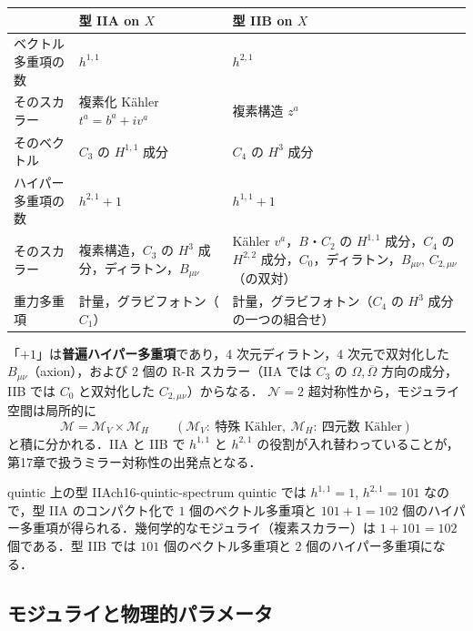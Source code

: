 \begin{center}
\small
\renewcommand{\arraystretch}{1.2}
\begin{tabular}{p{}p{}p{}}
\hline
 & 型 IIA on $X$ & 型 IIB on $X$\\
\hline
ベクトル多重項の数 & $h^{1,1}$ & $h^{2,1}$\\
\quad そのスカラー & 複素化 K\"ahler $t^a=b^a+iv^a$ & 複素構造 $z^a$\\
\quad そのベクトル & $C_3$ の $H^{1,1}$ 成分 & $C_4$ の $H^3$ 成分\\
ハイパー多重項の数 & $h^{2,1}+1$ & $h^{1,1}+1$\\
\quad そのスカラー & 複素構造，$C_3$ の $H^3$ 成分，ディラトン，$B_{\mu\nu}$ & K\"ahler $v^a$，$B$・$C_2$ の $H^{1,1}$ 成分，$C_4$ の $H^{2,2}$ 成分，$C_0$，ディラトン，$B_{\mu\nu}$, $C_{2,\mu\nu}$（の双対）\\
重力多重項 & 計量，グラビフォトン（$C_1$） & 計量，グラビフォトン（$C_4$ の $H^3$ 成分の一つの組合せ）\\
\hline
\end{tabular}
\end{center}

「$+1$」は\textbf{普遍ハイパー多重項}であり，4 次元ディラトン，4 次元で双対化した $B_{\mu\nu}$（axion），および 2 個の R-R スカラー（IIA では $C_3$ の $\Omega,\overline\Omega$ 方向の成分，IIB では $C_0$ と双対化した $C_{2,\mu\nu}$）からなる．
$\mathcal{N}=2$ 超対称性から，モジュライ空間は局所的に
\[
\mathcal{M}=\mathcal{M}_{V}\times\mathcal{M}_{H}\qquad(\mathcal{M}_V:\ \text{特殊 K\"ahler},\ \mathcal{M}_H:\ \text{四元数 K\"ahler})
\]
と積に分かれる．IIA と IIB で $h^{1,1}$ と $h^{2,1}$ の役割が入れ替わっていることが，第17章で扱うミラー対称性の出発点となる．

\begin{myex}{quintic 上の型 IIA}{ch16-quintic-spectrum}
quintic では $h^{1,1}=1$, $h^{2,1}=101$ なので，型 IIA のコンパクト化で $1$ 個のベクトル多重項と $101+1=102$ 個のハイパー多重項が得られる．幾何学的なモジュライ（複素スカラー）は $1+101=102$ 個である．型 IIB では $101$ 個のベクトル多重項と $2$ 個のハイパー多重項になる．
\end{myex}

\subsection{モジュライと物理的パラメータ}

